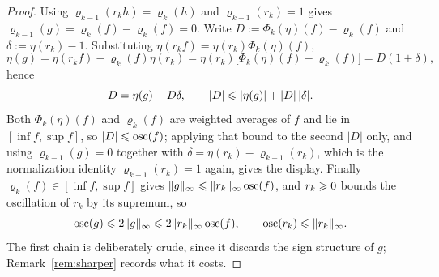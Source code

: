 \documentclass{article}
\begin{document}
\begin{proof}
Using $\varrho_{k-1}(r_kh)=\varrho_k(h)$ and $\varrho_{k-1}(r_k)=1$ gives $\varrho_{k-1}(g)=\varrho_k(f)-\varrho_k(f)=0$. Write $D:=\Phi_k(\eta)(f)-\varrho_k(f)$ and $\delta:=\eta(r_k)-1$. Substituting $\eta(r_kf)=\eta(r_k)\Phi_k(\eta)(f)$,
\begin{equation*}
    \eta(g) = \eta(r_kf)-\varrho_k(f)\eta(r_k) = \eta(r_k)\bigl[\Phi_k(\eta)(f)-\varrho_k(f)\bigr] = D(1+\delta),
\end{equation*}
hence
\begin{equation*}
    D = \eta(g) - D\delta ,
    \qquad
    |D| \leqslant |\eta(g)| + |D|\,|\delta| .
\end{equation*}
Both $\Phi_k(\eta)(f)$ and $\varrho_k(f)$ are weighted averages of $f$ and lie in $[\inf f,\sup f]$, so $|D|\leqslant\operatorname{osc}(f)$; applying that bound to the second $|D|$ only, and using $\varrho_{k-1}(g)=0$ {\color{red}together with $\delta=\eta(r_k)-\varrho_{k-1}(r_k)$, which is the normalization identity $\varrho_{k-1}(r_k)=1$ again}, gives the display. Finally $\varrho_k(f)\in[\inf f,\sup f]$ gives $\lVert g\rVert_\infty\leqslant\lVert r_k\rVert_\infty\operatorname{osc}(f)$, and $r_k\geqslant0$ bounds the oscillation of $r_k$ by its supremum, so
\begin{equation*}
    \operatorname{osc}(g) \leqslant 2\lVert g\rVert_\infty \leqslant 2\lVert r_k\rVert_\infty\operatorname{osc}(f) ,
    \qquad
    \operatorname{osc}(r_k) \leqslant \lVert r_k\rVert_\infty .
\end{equation*}
{\color{red}The first chain is deliberately crude, since it discards the sign structure of $g$; Remark~\ref{rem:sharper} records what it costs.}
\end{proof}
\end{document}
